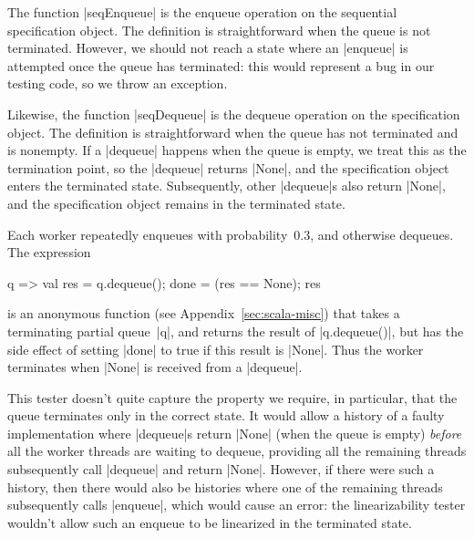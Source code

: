 The function |seqEnqueue| is the enqueue operation on the sequential
specification object.  The definition is straightforward when the queue is not
terminated.  However, we should not reach a state where an |enqueue| is
attempted once the queue has terminated: this would represent a bug in our
testing code, so we throw an exception.

Likewise, the function |seqDequeue| is the dequeue operation on the
specification object.  The definition is straightforward when the queue has
not terminated and is nonempty.  If a |dequeue| happens when the queue is
empty, we treat this as the termination point, so the |dequeue| returns
|None|, and the specification object enters the terminated state.
Subsequently, other |dequeue|s also return |None|, and the specification
object remains in the terminated state.

Each worker repeatedly enqueues with probability~$0.3$, and otherwise
dequeues.    The expression 
\begin{scala}
  q => {val res = q.dequeue(); done = (res == None); res}
\end{scala}
is an anonymous function (see Appendix~\ref{sec:scala-misc}) that takes a
terminating partial queue~|q|, and returns the result of |q.dequeue()|, but
has the side effect of setting |done| to true if this result is |None|.  Thus
the worker terminates when |None| is received from a |dequeue|.

This tester doesn't quite capture the property we require, in particular, that
the queue terminates only in the correct state.  It would allow a history of a
faulty implementation where |dequeue|s return |None| (when the queue is empty)
\emph{before} all the worker threads are waiting to dequeue, providing all the
remaining threads subsequently call |dequeue| and return |None|.
However, if there were such a history, then there would also be histories
where one of the remaining threads subsequently calls |enqueue|, which would
cause an error: the linearizability tester wouldn't allow such an enqueue to
be linearized in the terminated state.
